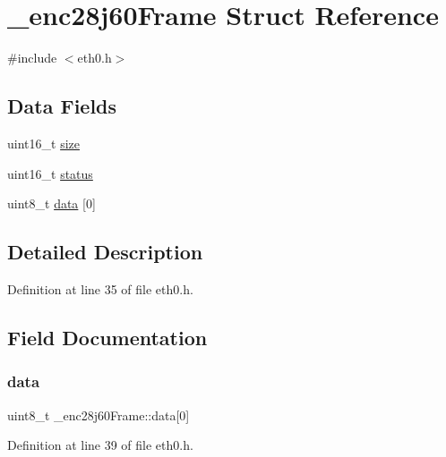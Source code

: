 \hypertarget{struct__enc28j60Frame}{}\section{\+\_\+enc28j60\+Frame Struct Reference}
\label{struct__enc28j60Frame}


{\ttfamily \#include $<$eth0.\+h$>$}

\subsection*{Data Fields}
\begin{DoxyCompactItemize}
\item 
uint16\+\_\+t \hyperlink{struct__enc28j60Frame_a62cb7de85fcefe73e0ddb5006da221a7}{size}
\item 
uint16\+\_\+t \hyperlink{struct__enc28j60Frame_a1833f4cb8b219df481491088095eb1d3}{status}
\item 
uint8\+\_\+t \hyperlink{struct__enc28j60Frame_aba2c4ba29e5bced4008429f852c0a03a}{data} \mbox{[}0\mbox{]}
\end{DoxyCompactItemize}


\subsection{Detailed Description}


Definition at line 35 of file eth0.\+h.



\subsection{Field Documentation}
\mbox{\label{struct__enc28j60Frame_aba2c4ba29e5bced4008429f852c0a03a}} 
\subsubsection{\texorpdfstring{data}{data}}
{\footnotesize\ttfamily uint8\+\_\+t \+\_\+enc28j60\+Frame\+::data\mbox{[}0\mbox{]}}



Definition at line 39 of file eth0.\+h.

\mbox{\label{struct__enc28j60Frame_a62cb7de85fcefe73e0ddb5006da221a7}} 
